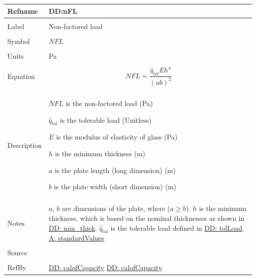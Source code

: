 \documentclass[12pt]{article}
\begin{document}
\noindent \begin{minipage}{\textwidth}
\begin{tabular}{p{} p{}}
\toprule \textbf{Refname} & \textbf{DD:nFL}
\label{DD:nFL}
\\ \midrule \\
Label & Non-factored load
\\ \midrule \\
Symbol & $NFL$
\\ \midrule \\
Units & Pa
\\ \midrule \\
Equation & \begin{displaymath}
           NFL=\frac{{\hat{q}_{tol}} E h^{4}}{\left(a b\right)^{2}}
           \end{displaymath}
\\ \midrule \\
Description & \begin{symbDescription}
              \item{$NFL$ is the non-factored load (Pa)}
              \item{${\hat{q}_{tol}}$ is the tolerable load (Unitless)}
              \item{$E$ is the modulus of elasticity of glass (Pa)}
              \item{$h$ is the minimum thickness (m)}
              \item{$a$ is the plate length (long dimension) (m)}
              \item{$b$ is the plate width (short dimension) (m)}
              \end{symbDescription}
\\ \midrule \\
Notes & $a$, $b$ are dimensions of the plate, where ($a\geq{}b$).
        $h$ is the minimum thickness, which is based on the nominal thicknesses as shown in \hyperref[DD:min.thick]{DD: min\_thick}.
        ${\hat{q}_{tol}}$ is the tolerable load defined in \hyperref[DD:tolLoad]{DD: tolLoad}.
        \hyperref[assumpSV]{A: standardValues}
\\ \midrule \\
Source & \cite{astm2009}
\\ \midrule \\
RefBy & \hyperref[DD:calofCapacity]{DD: calofCapacity} \hyperref[DD:calofCapacity]{DD: calofCapacity}.
\\ \bottomrule \end{tabular}
\end{minipage}
\par~
\end{document}
